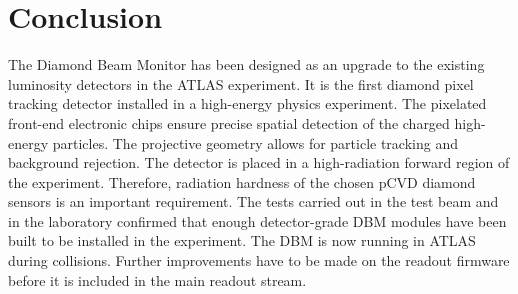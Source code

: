 \documentclass[twoside,12pt]{packages/mytustyle}  %
\begin{document}
\section{Conclusion}
\label{sec:limitations}
The Diamond Beam Monitor has been designed as an upgrade to the existing luminosity detectors in the ATLAS experiment. It is the first diamond pixel tracking detector installed in a high-energy physics experiment. The pixelated front-end electronic chips ensure precise spatial detection of the charged high-energy particles. The projective geometry allows for particle tracking and background rejection. The detector is placed in a high-radiation forward region of the experiment. Therefore, radiation hardness of the chosen pCVD diamond sensors is an important requirement. The tests carried out in the test beam and in the laboratory confirmed that enough detector-grade DBM modules have been built to be installed in the experiment. The DBM is now running in ATLAS during collisions. Further improvements have to be made on the readout firmware before it is included in the main readout stream. 



{}



\end{document}
